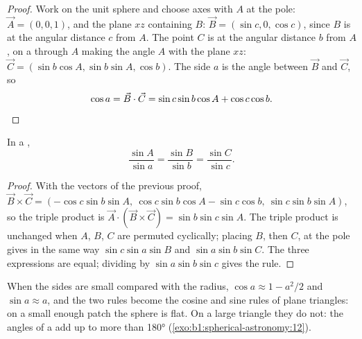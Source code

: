 \begin{proof}
Work on the unit sphere and choose axes with $A$ at the pole:
$\vec A = (0, 0, 1)$, and the plane $xz$ containing $B$:
$\vec B = (\sin c, 0, \cos c)$, since $B$ is at the angular distance $c$ from
$A$. The point $C$ is at the angular distance $b$ from $A$, on a 
through $A$ making the angle $A$ with the plane $xz$:
$\vec C = (\sin b\cos A, \sin b\sin A, \cos b)$. The side $a$ is the angle
between $\vec B$ and $\vec C$, so
\[
  \cos a = \vec B\cdot\vec C = \sin c\sin b\cos A + \cos c\cos b. \qedhere
\]
\end{proof}

\begin{theorem}\label{thm:b1:spherical-astronomy:sine-rule}
In a ,
\[
  \frac{\sin A}{\sin a} = \frac{\sin B}{\sin b} = \frac{\sin C}{\sin c}.
\]
\end{theorem}

\begin{proof}
With the vectors of the previous proof,
$\vec B \times \vec C = (-\cos c\sin b\sin A,\ \cos c\sin b\cos A - \sin c\cos b,\
\sin c\sin b\sin A)$, so the triple product is
$\vec A\cdot(\vec B\times\vec C) = \sin b\sin c\sin A$. The triple product is
unchanged when $A$, $B$, $C$ are permuted cyclically; placing $B$, then $C$,
at the pole gives in the same way $\sin c\sin a\sin B$ and $\sin a\sin b\sin
C$. The three expressions are equal; dividing by $\sin a\sin b\sin c$ gives
the rule.
\end{proof}

When the sides are small compared with the radius, $\cos a \approx 1 -
a^2/2$ and $\sin a \approx a$, and the two rules become the cosine and sine
rules of plane triangles: on a small enough patch the sphere is flat. On a
large triangle they do not: the angles of a  add up to more
than \ang{180} (\cref{exo:b1:spherical-astronomy:12}).

